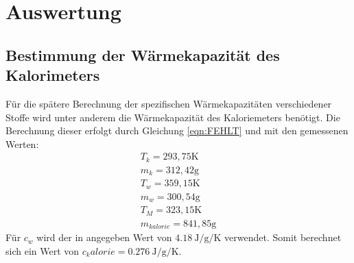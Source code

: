 \section{Auswertung}
\label{sec:Auswertung}

\subsection{Bestimmung der Wärmekapazität des Kalorimeters}
\label{sec:Kalorie}
Für die spätere Berechnung der spezifischen Wärmekapazitäten verschiedener Stoffe wird unter anderem die Wärmekapazität des Kaloriemeters benötigt.
Die Berechnung dieser erfolgt durch Gleichung \ref{eqn:FEHLT} und mit den gemessenen Werten:
\begin{align*}
 T_k = 293,75 \text{K}\\
 m_k = 312,42 \text{g}\\
 T_w = 359,15 \text{K}\\
 m_w = 300,54 \text{g}\\
 T_M = 323,15 \text{K}\\
 m_{kalorie} = 841,85 \text{g}
\end{align*}
Für $c_w$ wird der in \cite{V201} angegeben Wert von $\SI{4,18}{\joule\per\gram\per\kelvin}$ verwendet.
Somit berechnet sich ein Wert von $ c_kalorie = \SI{0,276}{\joule\per\gram\per\kelvin}.$

